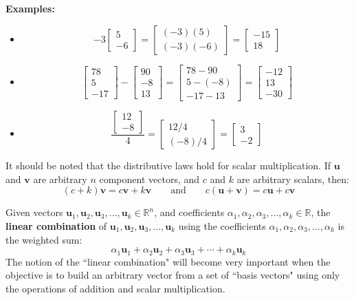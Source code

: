 \documentclass{article}
\begin{document}
\textbf{Examples:}
\begin{itemize}
\item 
\[-3\begin{bmatrix} 5 \\ -6 \end{bmatrix} = \begin{bmatrix} (-3)(5) \\ (-3)(-6) \end{bmatrix} = \begin{bmatrix} -15 \\ 18 \end{bmatrix}\]
\item 
\[\begin{bmatrix} 78 \\ 5 \\ -17 \end{bmatrix} - \begin{bmatrix} 90 \\ -8 \\ 13 \end{bmatrix} = \begin{bmatrix} 78 - 90 \\ 5 - (-8) \\ -17 - 13 \end{bmatrix} = \begin{bmatrix} -12 \\ 13 \\ -30 \end{bmatrix}\]
\item 
\[\frac{\begin{bmatrix} 12 \\ -8 \end{bmatrix}}{4} = \begin{bmatrix} 12/4 \\ (-8)/4 \end{bmatrix} = \begin{bmatrix} 3 \\ -2 \end{bmatrix}\]
\end{itemize}

It should be noted that the distributive laws hold for scalar multiplication. If \(\mathbf{u}\) and \(\mathbf{v}\) are arbitrary \(n\) component vectors, and \(c\) and \(k\) are arbitrary scalars, then: 
\[(c + k)\mathbf{v} = c\mathbf{v} + k\mathbf{v} \quad\quad\text{and}\quad\quad c(\mathbf{u} + \mathbf{v}) = c\mathbf{u} + c\mathbf{v}\]

Given vectors \(\mathbf{u}_1, \mathbf{u}_2, \mathbf{u}_3, ..., \mathbf{u}_k \in \mathbb{R}^n\), and coefficients \(\alpha_1, \alpha_2, \alpha_3, ..., \alpha_k \in \mathbb{R}\), the {\bf linear combination} of \(\mathbf{u}_1, \mathbf{u}_2, \mathbf{u}_3, ..., \mathbf{u}_k\) using the coefficients \(\alpha_1, \alpha_2, \alpha_3, ..., \alpha_k\) is the weighted sum:
\[\alpha_1 \mathbf{u}_1 + \alpha_2 \mathbf{u}_2 + \alpha_3 \mathbf{u}_3 + \cdots + \alpha_k \mathbf{u}_k\]  
The notion of the ``linear combination" will become very important when the objective is to build an arbitrary vector from a set of ``basis vectors" using only the operations of addition and scalar multiplication.
\end{document}
